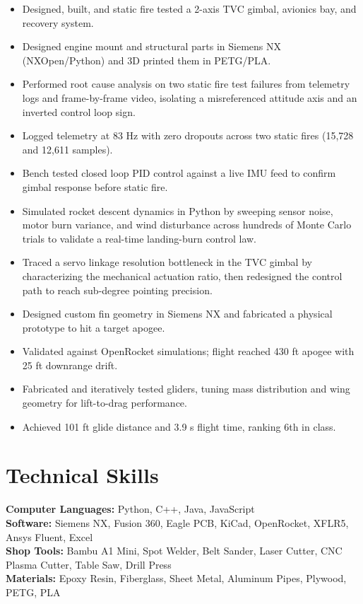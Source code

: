 \begin{itemize}
  \item Designed, built, and static fire tested a 2-axis TVC gimbal, avionics bay, and recovery system.
  \item Designed engine mount and structural parts in Siemens NX (NXOpen/Python) and 3D printed them in PETG/PLA.
  \item Performed root cause analysis on two static fire test failures from telemetry logs and frame-by-frame video, isolating a misreferenced attitude axis and an inverted control loop sign.
  \item Logged telemetry at 83 Hz with zero dropouts across two static fires (15,728 and 12,611 samples).
  \item Bench tested closed loop PID control against a live IMU feed to confirm gimbal response before static fire.
  \item Simulated rocket descent dynamics in Python by sweeping sensor noise, motor burn variance, and wind disturbance across hundreds of Monte Carlo trials to validate a real-time landing-burn control law.
  \item Traced a servo linkage resolution bottleneck in the TVC gimbal by characterizing the mechanical actuation ratio, then redesigned the control path to reach sub-degree pointing precision.
\end{itemize}
\entrygap

\begin{itemize}
  \item Designed custom fin geometry in Siemens NX and fabricated a physical prototype to hit a target apogee.
  \item Validated against OpenRocket simulations; flight reached 430 ft apogee with 25 ft downrange drift.
\end{itemize}
\entrygap

\begin{itemize}
  \item Fabricated and iteratively tested gliders, tuning mass distribution and wing geometry for lift-to-drag performance.
  \item Achieved 101 ft glide distance and 3.9 s flight time, ranking 6th in class.
\end{itemize}

\section{Technical Skills}
\textbf{Computer Languages:} Python, C++, Java, JavaScript\\
\textbf{Software:} Siemens NX, Fusion 360, Eagle PCB, KiCad, OpenRocket, XFLR5, Ansys Fluent, Excel\\
\textbf{Shop Tools:} Bambu A1 Mini, Spot Welder, Belt Sander, Laser Cutter, CNC Plasma Cutter, Table Saw, Drill Press\\
\textbf{Materials:} Epoxy Resin, Fiberglass, Sheet Metal, Aluminum Pipes, Plywood, PETG, PLA

